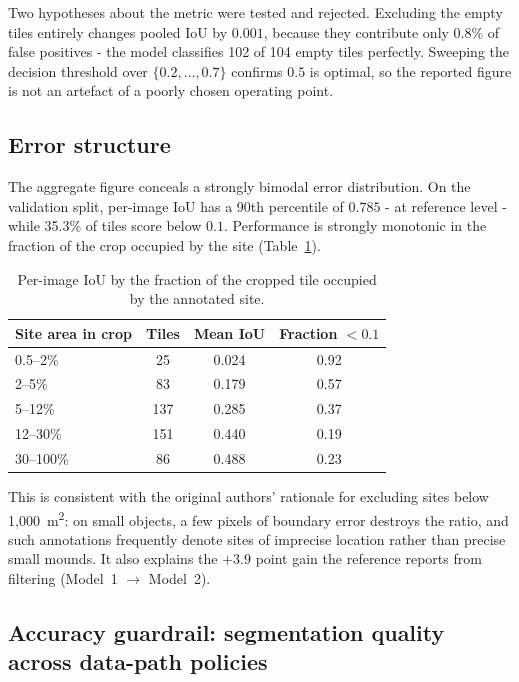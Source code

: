 Two hypotheses about the metric were tested and rejected.
Excluding the empty tiles entirely changes pooled IoU by $0.001$, because they
contribute only 0.8\% of false positives - the model classifies 102 of 104 empty
tiles perfectly.
Sweeping the decision threshold over $\{0.2, \dots, 0.7\}$ confirms $0.5$ is optimal,
so the reported figure is not an artefact of a poorly chosen operating point.

\subsection{Error structure}
\label{sec:repro-error}

The aggregate figure conceals a strongly bimodal error distribution.
On the validation split, per-image IoU has a 90th percentile of $0.785$ - at
reference level - while 35.3\% of tiles score below $0.1$.
Performance is strongly monotonic in the fraction of the crop occupied by the site
(Table~\ref{tab:by-area}).

\begin{table}[!ht]
\centering
\begin{tabular}{lccc}
\toprule
Site area in crop & Tiles & Mean IoU & Fraction $< 0.1$ \\
\midrule
0.5--2\%    &  25 & 0.024 & 0.92 \\
2--5\%      &  83 & 0.179 & 0.57 \\
5--12\%     & 137 & 0.285 & 0.37 \\
12--30\%    & 151 & 0.440 & 0.19 \\
30--100\%   &  86 & 0.488 & 0.23 \\
\bottomrule
\end{tabular}
\caption[Per-image IoU by site area in the crop]{Per-image IoU by the fraction of the cropped tile occupied by the
annotated site.}
\label{tab:by-area}
\end{table}

This is consistent with the original authors' rationale for excluding sites below
1{,}000~m\textsuperscript{2}: on small objects, a few pixels of boundary error
destroys the ratio, and such annotations frequently denote sites of imprecise
location rather than precise small mounds.
It also explains the $+3.9$ point gain the reference reports from filtering
(Model~1 $\rightarrow$ Model~2).

\subsection{Accuracy guardrail: segmentation quality across data-path policies}
\label{sec:repro-guardrail}

